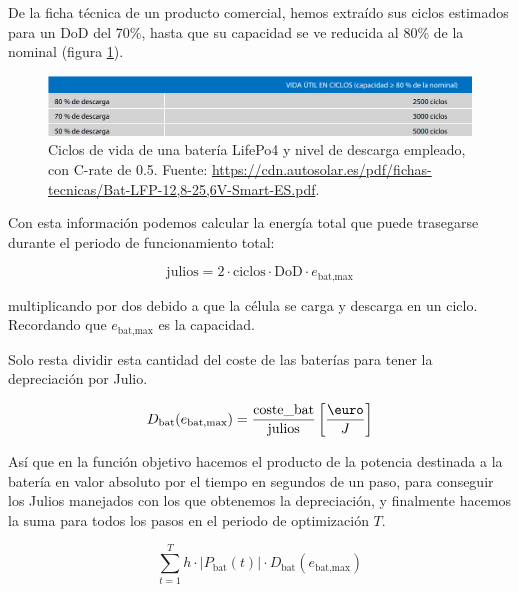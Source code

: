 De la ficha técnica de un producto comercial, hemos extraído sus ciclos
estimados para un DoD del 70\%, hasta que su capacidad se ve reducida al
80\% de la nominal (figura \ref{fig:battery_datasheet_cycles}).

\begin{figure}[h] \centering
	\centering
	\includegraphics[width=1\textwidth]{./capitulos/resultados_discusion/images/battery_datasheet_cycles.png}
	\caption{Ciclos de vida de una batería LifePo4 y nivel de descarga empleado,
		con C-rate de 0.5. Fuente:
		\url{https://cdn.autosolar.es/pdf/fichas-tecnicas/Bat-LFP-12,8-25,6V-Smart-ES.pdf}.}
	\label{fig:battery_datasheet_cycles}
\end{figure}

Con esta información podemos calcular la energía total que puede trasegarse durante
el periodo de funcionamiento total:

\begin{equation} \label{eq:battery_life_joules}
	\text{julios} = 2 \cdot \text{ciclos} \cdot \text{DoD} \cdot e_\text{bat,max}
\end{equation}

multiplicando por dos debido a que la célula se carga y descarga en un ciclo.
Recordando que $e_\text{bat,max}$ es la capacidad.

Solo resta dividir esta cantidad del coste de las baterías para tener la depreciación
por Julio.

\begin{equation} \label{eq:battery_depreciation_by_joule}
	D_\text{bat}(e_\text{bat,max}) = \frac{\text{coste\_bat}}{\text{julios}} \left[\frac{\text{\euro}}{J}\right]
\end{equation}

Así que en la función objetivo hacemos el producto de la potencia destinada a
la batería en valor absoluto por el tiempo en segundos de un paso, para
conseguir los Julios manejados con los que obtenemos la depreciación, y
finalmente hacemos la suma para todos los pasos en el periodo de optimización $T$.

\begin{equation}
	\sum_{t=1}^{T} h \cdot |P_\text{bat}(t)| \cdot D_\text{bat}(e_\text{bat,max})
\end{equation}


